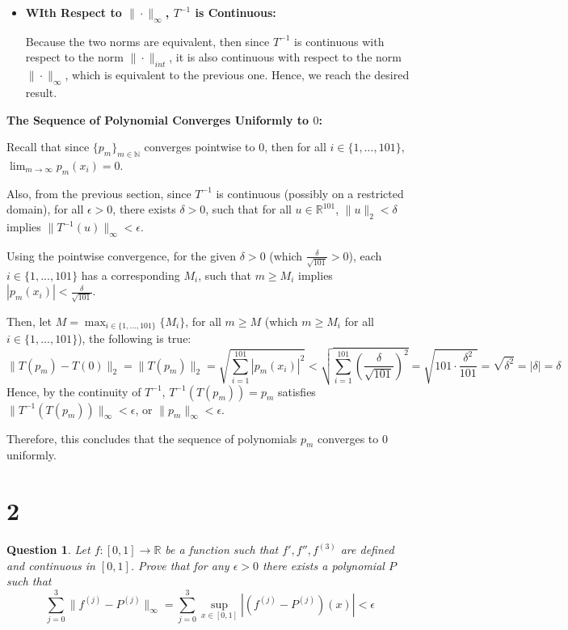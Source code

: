 \documentclass{article}
\newtheorem{question}{Question}
\begin{document}
\begin{itemize}
\begin{itemize}
        \item \textbf{WIth Respect to $\|\cdot\|_\infty$, $T^{-1}$ is Continuous:}
        
        Because the two norms are equivalent, then since $T^{-1}$ is continuous with respect to the norm $\|\cdot\|_{int}$, it is also continuous with respect to the norm $\|\cdot\|_\infty$, which is equivalent to the previous one.
        Hence, we reach the desired result.
    \end{itemize}

    \hfill

    \textbf{The Sequence of Polynomial Converges Uniformly to $0$:}

    Recall that since $\{p_m\}_{m\in\mathbb{N}}$ converges pointwise to $0$, then for all $i\in\{1,...,101\}$, $\lim_{m\rightarrow\infty}p_m(x_i)=0$.

    Also, from the previous section, since $T^{-1}$ is continuous (possibly on a restricted domain), for all $\epsilon>0$, there exists $\delta>0$, such that for all $u\in\mathbb{R}^{101}$, $\|u\|_2<\delta$ implies $\|T^{-1}(u)\|_\infty<\epsilon$.

    \hfill

    Using the pointwise convergence, for the given $\delta>0$ (which $\frac{\delta}{\sqrt{101}}>0$), each $i\in\{1,...,101\}$ has a corresponding $M_i$, such that $m\geq M_i$ implies $|p_m(x_i)|<\frac{\delta}{\sqrt{101}}$.

    Then, let $M = \max_{i\in\{1,...,101\}}\{M_i\}$, for all $m\geq M$ (which $m\geq M_i$ for all $i\in\{1,...,101\}$), the following is true:
    $$\|T(p_m)-T(0)\|_2 = \|T(p_m)\|_2 = \sqrt{\sum_{i=1}^{101}|p_m(x_i)|^2} < \sqrt{\sum_{i=1}^{101}\left(\frac{\delta}{\sqrt{101}}\right)^2} = \sqrt{101\cdot \frac{\delta^2}{101}} = \sqrt{\delta^2} = |\delta|=\delta$$
    Hence, by the continuity of $T^{-1}$, $T^{-1}(T(p_m)) = p_m$ satisfies $\|T^{-1}(T(p_m))\|_\infty < \epsilon$, or $\|p_m\|_\infty<\epsilon$.

    Therefore, this concludes that the sequence of polynomials $p_m$ converges to $0$ uniformly.
\end{itemize}

\break

\section*{2}
\begin{myBox}[]{}
    \begin{question}
        Let $f:[0,1]\rightarrow\mathbb{R}$ be a function such that $f',f'',f^{(3)}$ are defined and continuous in $[0,1]$.
        Prove that for any $\epsilon>0$ there exists a polynomial $P$ such that
        $$\sum_{j=0}^{3}\|f^{(j)}-P^{(j)}\|_\infty = \sum_{j=0}^{3}\sup_{x\in[0,1]}|(f^{(j)}-P^{(j)})(x)|<\epsilon$$
    \end{question}
\end{myBox}
\end{document}

